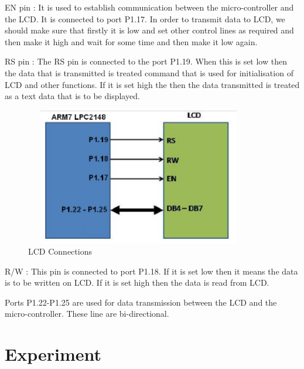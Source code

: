 \documentclass{article}
\begin{document}
\hspace{.2in}EN pin : It is used to establish communication between the micro-controller and the LCD. It is connected to port P1.17. In order to transmit data to LCD, we should make sure that firstly it is low and set other control lines as required and then make it high and wait for some time and then make it low again.\vspace{.1in}

\hspace{.2in}RS pin : The RS pin is connected to the port P1.19. When this is set low then the data that is transmitted is treated command that is used for initialisation of LCD and other functions. If it is set high the then the data transmitted is treated as a text data that is to be displayed.\vspace{.1in}
\begin{figure}[h]
\centering
\includegraphics[width=10cm,height=6cm]{LCDconnections.PNG}
\caption{LCD Connections}
\end{figure}


\hspace{.2in}R/W : This pin is connected to port P1.18. If it is set low then it means the data is to be written on LCD. If it is set high then the data is read from LCD.\vspace{.1in}


\hspace{.2in}Ports P1.22-P1.25 are used for data transmission between the LCD and the micro-controller. These line are bi-directional. 

\section{Experiment}
\end{document}
